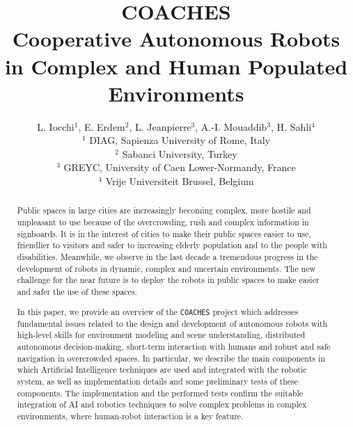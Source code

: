 \documentclass{llncs}
\def\coaches{{\tt COACHES} }
\begin{document}
%
%
%
%
\title{COACHES\\
Cooperative Autonomous Robots in Complex and Human Populated Environments}
%
%
\author{L. Iocchi$^1$,  E. Erdem$^2$,  L. Jeanpierre$^3$, A.-I. Mouaddib$^3$, H. Sahli$^4$ \\
$\,$\\
$^1$ DIAG, %
Sapienza University of Rome, Italy\\
$^2$ Sabanci University, Turkey \\
$^3$ GREYC, University of Caen Lower-Normandy, France\\
$^4$ Vrije Universiteit Brussel, Belgium
}

\institute{}
\date{}

%
%

\maketitle              %

\begin{abstract}

Public spaces in large cities are increasingly becoming complex, more hostile and  
unpleasant to use because of the overcrowding, rush and complex information in signboards. 
It is in the interest of cities to make their public spaces easier to use, friendlier to visitors and safer to increasing elderly population and to the people with disabilities. 
Meanwhile, we observe in the last decade a tremendous progress in the development of robots in dynamic, complex and uncertain environments. The new challenge for the near future is to deploy the robots in public spaces to make easier and safer the use of these spaces. 

In this paper, we provide an overview of the \coaches project which addresses fundamental issues related to the design and development of autonomous robots with high-level skills for environment modeling and scene understanding, distributed autonomous decision-making, short-term interaction with humans and robust and safe navigation in overcrowded spaces. 
In particular, we describe the main components in which Artificial Intelligence techniques are used and integrated with the robotic system, as well as implementation details and some preliminary tests of these components. The implementation and the performed tests confirm the suitable integration of AI and robotics techniques to solve complex problems in complex environments, where human-robot interaction is a key feature.

\end{abstract}
\end{document}
